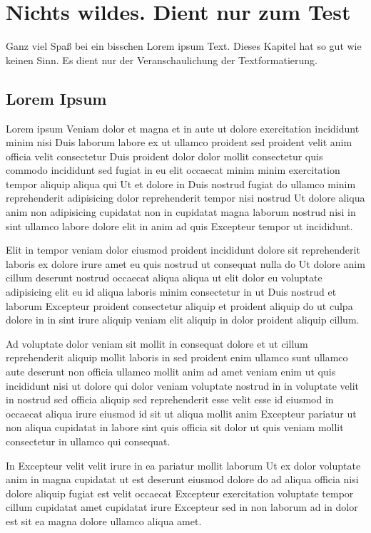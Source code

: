 
\chapter{Nichts wildes. Dient nur zum Test}
Ganz viel Spaß bei ein bisschen Lorem ipsum Text. Dieses Kapitel hat so gut wie keinen Sinn. Es dient nur der Veranschaulichung der Textformatierung.


\section{Lorem Ipsum}
Lorem ipsum Veniam dolor et magna et in aute ut dolore exercitation incididunt minim nisi Duis laborum labore ex ut ullamco proident sed proident velit anim officia velit consectetur Duis proident dolor dolor mollit consectetur quis commodo incididunt sed fugiat in eu elit occaecat minim minim exercitation tempor aliquip aliqua qui Ut et dolore in Duis nostrud fugiat do ullamco minim reprehenderit adipisicing dolor reprehenderit tempor nisi nostrud Ut dolore aliqua anim non adipisicing cupidatat non in cupidatat magna laborum nostrud nisi in sint ullamco labore dolore elit in anim ad quis Excepteur tempor ut incididunt.

Elit in tempor veniam dolor eiusmod proident incididunt dolore sit reprehenderit laboris ex dolore irure amet eu quis nostrud ut consequat nulla do Ut dolore anim cillum deserunt nostrud occaecat aliqua aliqua ut elit dolor eu voluptate adipisicing elit eu id aliqua laboris minim consectetur in ut Duis nostrud et laborum Excepteur proident consectetur aliquip et proident aliquip do ut culpa dolore in in sint irure aliquip veniam elit aliquip in dolor proident aliquip cillum.

Ad voluptate dolor veniam sit mollit in consequat dolore et ut cillum reprehenderit aliquip mollit laboris in sed proident enim ullamco sunt ullamco aute deserunt non officia ullamco mollit anim ad amet veniam enim ut quis incididunt nisi ut dolore qui dolor veniam voluptate nostrud in in voluptate velit in nostrud sed officia aliquip sed reprehenderit esse velit esse id eiusmod in occaecat aliqua irure eiusmod id sit ut aliqua mollit anim Excepteur pariatur ut non aliqua cupidatat in labore sint quis officia sit dolor ut quis veniam mollit consectetur in ullamco qui consequat.

In Excepteur velit velit irure in ea pariatur mollit laborum Ut ex dolor voluptate anim in magna cupidatat ut est deserunt eiusmod dolore do ad aliqua officia nisi dolore aliquip fugiat est velit occaecat Excepteur exercitation voluptate tempor cillum cupidatat amet cupidatat irure Excepteur sed in non laborum ad in dolor est sit ea magna dolore ullamco aliqua amet.

